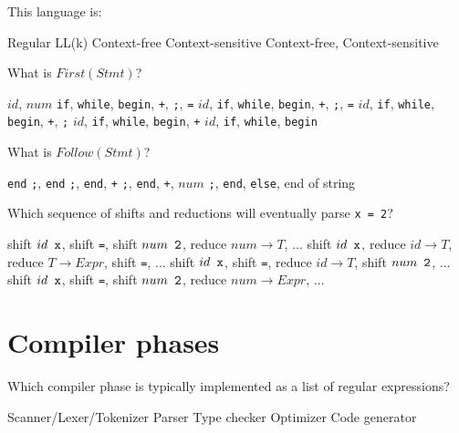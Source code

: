 \documentclass[addpoints]{exam}
\begin{document}
\begin{questions}
\question This language is:

\begin{oneparchoices}
\choice Regular
\choice LL(k)
\choice Context-free
\choice Context-sensitive
\choice Context-free, Context-sensitive
\end{oneparchoices}

\answerline

\question What is $First(Stmt)$?

\begin{choices}
\choice $id$, $num$ \verb+if+, \verb+while+, \verb+begin+, \verb|+|, \verb+;+, \verb+=+
\choice $id$, \verb+if+, \verb+while+, \verb+begin+, \verb|+|, \verb+;+, \verb+=+
\choice $id$, \verb+if+, \verb+while+, \verb+begin+, \verb|+|, \verb+;+
\choice $id$, \verb+if+, \verb+while+, \verb+begin+, \verb|+|
\choice $id$, \verb+if+, \verb+while+, \verb+begin+
\end{choices}

\answerline

\question What is $Follow(Stmt)$?

\begin{choices}
\choice \verb+end+
\choice \verb+;+, \verb+end+
\choice \verb+;+, \verb+end+, \verb|+|
\choice \verb+;+, \verb+end+, \verb|+|, $num$
\choice \verb+;+, \verb+end+, \verb+else+, end of string
\end{choices}

\answerline

\question Which sequence of shifts and reductions will eventually parse \verb+x = 2+?

\begin{choices}
\choice shift $id \verb+ x+$, shift \verb+=+, shift $num \verb+ 2+$, reduce $num \to T$, $\ldots$
\choice shift $id \verb+ x+$, reduce $id \to T$, reduce $T \to Expr$, shift \verb+=+, $\ldots$
\choice shift $id \verb+ x+$, shift \verb+=+, reduce $id \to T$, shift $num \verb+ 2+$, $\ldots$
\choice shift $id \verb+ x+$, shift \verb+=+, shift $num \verb+ 2+$, reduce $num \to Expr$, $\ldots$
\end{choices}

\answerline
\pagebreak

\section{Compiler phases}

\question Which compiler phase is typically implemented as a list of regular expressions?

\begin{oneparchoices}
\choice Scanner/Lexer/Tokenizer
\choice Parser
\choice Type checker
\choice Optimizer
\choice Code generator
\end{oneparchoices}


\end{questions}
\end{document}
